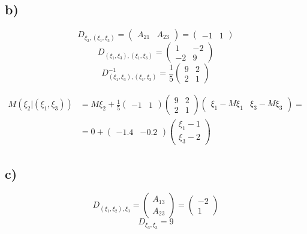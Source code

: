 \documentclass[11pt, a4paper]{article} %
\begin{document}
\subsection*{b)}

$$D_{\xi_2,(\xi_1,\xi_3)} = \begin{pmatrix}
    A_{21} & A_{23}
\end{pmatrix} = \begin{pmatrix}
    -1 & 1
\end{pmatrix}$$
$$D_{(\xi_1,\xi_3),(\xi_1,\xi_3)} = \begin{pmatrix}
    1 & -2 \\
    -2 & 9
\end{pmatrix}$$
$$D_{(\xi_1,\xi_3),(\xi_1,\xi_3)}^{-1} = \frac{1}{5} \begin{pmatrix}
    9 & 2 \\
    2 & 1
\end{pmatrix}$$

\begin{align*}
    M(\xi_2 | (\xi_1,\xi_3)) &= M\xi_2 + \frac{1}{5} \begin{pmatrix}
        -1 & 1
    \end{pmatrix} \begin{pmatrix}
        9 & 2 \\
        2 & 1
    \end{pmatrix} \begin{pmatrix}
        \xi_1 - M\xi_1 & \xi_3 - M\xi_3
    \end{pmatrix} = \\
    &= 0 + \begin{pmatrix}
        -1.4 & -0.2
    \end{pmatrix} \begin{pmatrix}
        \xi_1 - 1 \\
        \xi_3 - 2
    \end{pmatrix}
\end{align*}

\subsection*{c)}
$$D_{(\xi_1,\xi_2),\xi_3} = \begin{pmatrix}
    A_{13} \\ A_{23}
\end{pmatrix} = \begin{pmatrix}
    -2 \\ 1
\end{pmatrix}$$
$$D_{\xi_3,\xi_3} = 9$$
\end{document}
